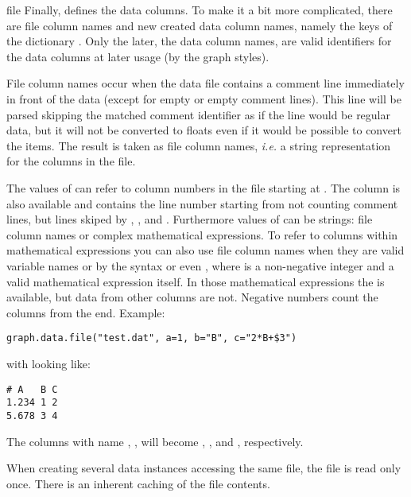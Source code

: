 \begin{classdesc}{file}
  Finally,  defines the data columns. To make it a bit
  more complicated, there are file column names and new created data
  column names, namely the keys of the dictionary .
  Only the later, the data column names, are valid identifiers for the
  data columns at later usage (by the graph styles).

  File column names occur when the data file contains a comment line
  immediately in front of the data (except for empty or empty comment
  lines). This line will be parsed skipping the matched comment
  identifier as if the line would be regular data, but it will not be
  converted to floats even if it would be possible to convert the
  items. The result is taken as file column names, \emph{i.e.} a
  string representation for the columns in the file.

  The values of  can refer to column numbers in the
  file starting at . The column  is also available
  and contains the line number starting from  not counting
  comment lines, but lines skiped by , ,
  and . Furthermore values of  can be
  strings: file column names or complex mathematical expressions. To
  refer to columns within mathematical expressions you can also use
  file column names when they are valid variable names or by the
  syntax  or even
  , where  is a non-negative integer and  a valid mathematical expression itself. In
  those mathematical expressions the  is available, but
  data from other columns are not. Negative numbers count the columns
  from the end. Example:
  \begin{verbatim}
graph.data.file("test.dat", a=1, b="B", c="2*B+$3")
  \end{verbatim}
  with  looking like:
  \begin{verbatim}
# A   B C
1.234 1 2
5.678 3 4
  \end{verbatim}
  The columns with name , ,  will become
  , , and , respectively.

  When creating several data instances accessing the same file,
  the file is read only once. There is an inherent caching of the
  file contents.
\end{classdesc}

